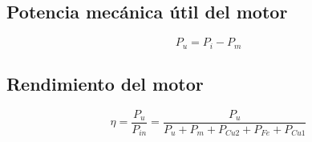 \documentclass[../main]{subfiles}
\begin{document}
\subsection{Potencia mecánica útil del motor}
\begin{equation}
  P_u = P_i - P_m
\end{equation}

\subsection{Rendimiento del motor}
\begin{equation}
  \eta = \dfrac{P_u}{P_{in}} = \dfrac{P_u}{P_u + P_m + P_{Cu2} + P_{Fe} + P_{Cu1}}
\end{equation}

\end{document}
